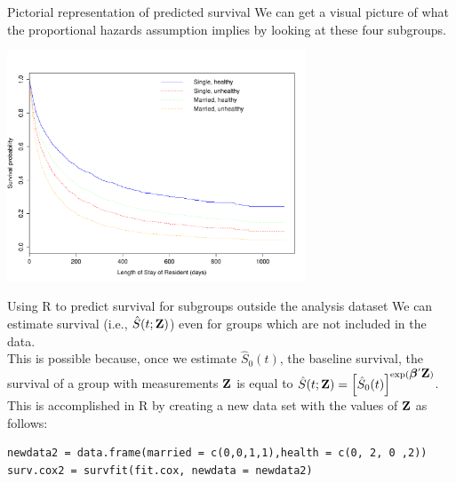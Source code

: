 \documentclass[envcountsect, 10pt, portrait, palatino]{beamer}
\newcommand{\bfbeta}{{\mbox{\boldmath$\beta$}}}
\newcommand{\bfZ}{{\mbox{{\bf Z}}}}
\begin{document}
\begin{frame}{Pictorial representation of predicted survival}
We can get a visual picture of what the proportional
hazards assumption implies by looking at these four subgroups.

\centerline{\includegraphics[width=3.5in]{nhpredsurv.pdf}}
\vspace{0.5in}
\end{frame}
\begin{frame}[fragile]{Using R to predict survival for subgroups outside the analysis dataset}
We can estimate survival (i.e., $\hat{S}(t;\bfZ)$) even for groups which are not included in the data.\\[2ex]
This is possible because, once we estimate $\hat{S}_0(t)$, the baseline survival, the survival of a group with measurements $\bfZ$ is equal to $\hat{S}(t;\bfZ)=\left [ \hat{S}_0(t)\right ]^{\exp(\bfbeta'\bfZ)}$.
\\[2ex]
This is accomplished in R by creating a new data set with the values of $\bfZ$ as follows:

\small
\begin{verbatim}
newdata2 = data.frame(married = c(0,0,1,1),health = c(0, 2, 0 ,2))
surv.cox2 = survfit(fit.cox, newdata = newdata2)
\end{verbatim}
\end{frame}
\end{document}
